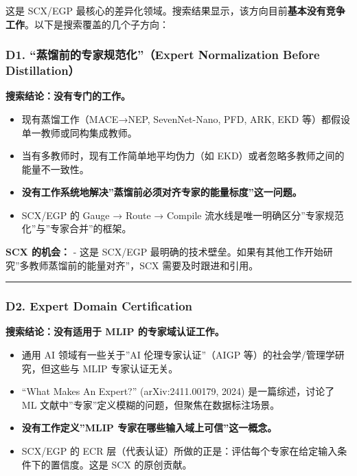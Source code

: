 \documentclass[
  12pt,
]{ctexart}
\providecommand{\tightlist}{%
  \setlength{\itemsep}{0pt}\setlength{\parskip}{0pt}}
\begin{document}
这是 SCX/EGP
最核心的差异化领域。搜索结果显示，该方向目前\textbf{基本没有竞争工作}。以下是搜索覆盖的几个子方向：

\subsubsection{D1. ``蒸馏前的专家规范化''（Expert Normalization Before
Distillation）}\label{d1.-ux84b8ux998fux524dux7684ux4e13ux5bb6ux89c4ux8303ux5316expert-normalization-before-distillation}

\textbf{搜索结论：没有专门的工作。}

\begin{itemize}
\tightlist
\item
  现有蒸馏工作（MACE→NEP, SevenNet-Nano, PFD, ARK, EKD
  等）都假设单一教师或同构集成教师。
\item
  当有多教师时，现有工作简单地平均伪力（如
  EKD）或者忽略多教师之间的能量不一致性。
\item
  \textbf{没有工作系统地解决''蒸馏前必须对齐专家的能量标度''这一问题。}
\item
  SCX/EGP 的 Gauge → Route → Compile
  流水线是唯一明确区分''专家规范化''与''专家合并''的框架。
\end{itemize}

\textbf{SCX 的机会：} - 这是 SCX/EGP
最明确的技术壁垒。如果有其他工作开始研究''多教师蒸馏前的能量对齐''，SCX
需要及时跟进和引用。

\begin{center}\rule{0.5\linewidth}{0.5pt}\end{center}

\subsubsection{D2. Expert Domain
Certification}\label{d2.-expert-domain-certification}

\textbf{搜索结论：没有适用于 MLIP 的专家域认证工作。}

\begin{itemize}
\tightlist
\item
  通用 AI 领域有一些关于''AI 伦理专家认证''（AIGP
  等）的社会学/管理学研究，但这些与 MLIP 专家认证无关。
\item
  ``What Makes An Expert?'' (arXiv:2411.00179, 2024) 是一篇综述，讨论了
  ML 文献中''专家''定义模糊的问题，但聚焦在数据标注场景。
\item
  \textbf{没有工作定义''MLIP 专家在哪些输入域上可信''这一概念。}
\item
  SCX/EGP 的 ECR
  层（代表认证）所做的正是：评估每个专家在给定输入条件下的置信度。这是
  SCX 的原创贡献。
\end{itemize}
\end{document}
